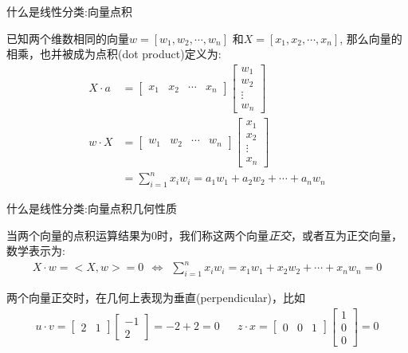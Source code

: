 \documentclass[handout]{ctexbeamer}
\begin{document}
\begin{frame}{什么是线性分类:向量点积}
\begin{definition}
	已知两个维数相同的向量$w=[w_1, w_2, \cdots, w_n]$ 和$X = [x_1, x_2, \cdots, x_n]$, 那么向量的相乘，也并被成为点积(dot product)定义为:
\begin{align*}
		 X \cdot a & = \begin{bmatrix}
		x_1 & x_2 & \cdots & x_n
	\end{bmatrix} \begin{bmatrix}
		w_1 \\
		w_2 \\
		\vdots \\
		w_n
	\end{bmatrix} \\
	 w \cdot X & = \begin{bmatrix}
		w_1 & w_2 & \cdots & w_n
	\end{bmatrix} \begin{bmatrix}
		x_1 \\
		x_2 \\
		\vdots \\
		x_n
	\end{bmatrix}\\
	& =  \sum_{i=1}^n x_i w_i = a_1 w_1 + a_2 w_2 + \cdots + a_n w_n 
\end{align*}
\end{definition}
\end{frame}

\begin{frame}{什么是线性分类:向量点积几何性质}
\begin{definition}
	当两个向量的点积运算结果为$0$时，我们称这两个向量\textit{正交}，或者互为正交向量，数学表示为:
	\begin{align*}
		 X \cdot w = <X, w> = 0 \ \ \Leftrightarrow \ \ \sum_{i=1}^n  x_i w_i =  x_1 w_1 +  x_2 w_2 + \cdots +  x_n w_n = 0 
	\end{align*}
\end{definition}

两个向量正交时，在几何上表现为垂直(perpendicular)，比如
\begin{align*}
	u \cdot v = \begin{bmatrix}
		2 & 1 
	\end{bmatrix} \begin{bmatrix}
		-1 \\
		2
	\end{bmatrix} = -2 + 2 = 0 & &  z \cdot x = \begin{bmatrix}
		0 & 0 & 1
	\end{bmatrix} \begin{bmatrix}
		1 \\
		0 \\
		0
	\end{bmatrix} = 0 
\end{align*}		
\end{frame}
\end{document}
